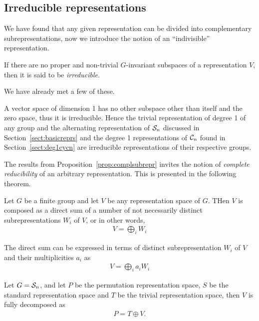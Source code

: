 \subsection{Irreducible representations}

We have found that any given representation can be divided into complementary subrepresentations, now we introduce the notion of an ``indivisible'' representation.

\begin{definition}
	If there are no proper and non-trivial $G$-invariant subspaces of a representation $V$, then it is said to be \textit{irreducible}. 
\end{definition}

We have already met a few of these.

\begin{example}\cite[Example 1.4.2.]{Sagan}
	A vector space of dimension 1 has no other subspace other than itself and the zero space, thus it is irreducible. Hence the trivial representation of degree 1 of any group and the alternating representation of $\mathcal{S}_n$ discussed in Section~\ref{sect:basicreprs} and the degree 1 representations of $\mathcal{C}_n$ found in Section~\ref{sect:deg1cycn} are irreducible representations of their respective groups.
\end{example}

The results from Proposition~\ref{prop:complsubrepr} invites the notion of \textit{complete reducibility} of an arbitrary representation. This is presented in the following theorem.

\begin{theorem}\label{thm:maschkes}
	Let $G$ be a finite group and let $V$ be any representation space of $G$. THen $V$ is composed as a direct sum of a number of not necessarily distinct subrepresentations $W_i$ of $V$, or in other words,
	\begin{align*}
		V = \bigoplus_i W_i
	\end{align*}
	\begin{note}
		The direct sum can be expressed in terms of distinct subrepresentation $W_i$ of $V$ and their multiplicities $a_i$ as
		\begin{align*}
			V = \bigoplus_i a_i W_i
		\end{align*}
	\end{note}
\end{theorem}

\begin{example}
	Let $G = \mathcal{S}_n$, and let $P$ be the permutation representation space, $S$ be the standard representation space and $T$ be the trivial representation space, then $V$ is fully decomposed as 
	\begin{align*}
		P = T \oplus V.
	\end{align*}
\end{example}

